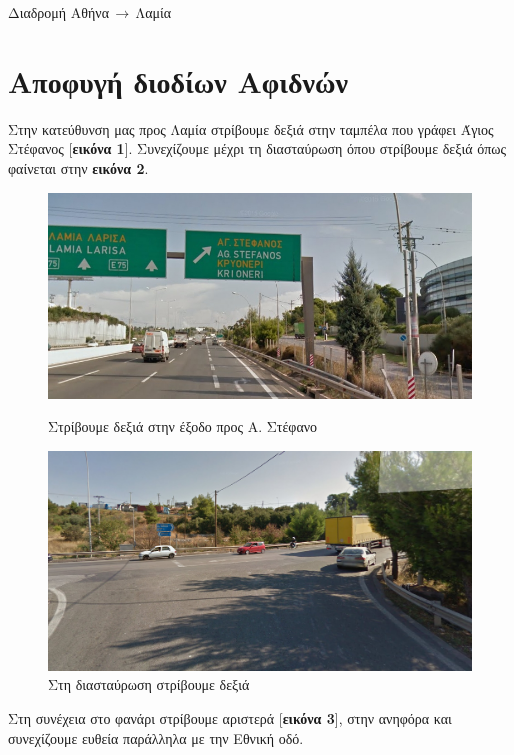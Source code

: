 \begin{center}
\begin{huge}
Διαδρομή Αθήνα$\,\to\,$Λαμία
\end{huge}
\section*{Αποφυγή διοδίων Αφιδνών}
\end{center}
Στην κατεύθυνση μας προς Λαμία στρίβουμε δεξιά στην ταμπέλα που γράφει Άγιος Στέφανος [\textbf{εικόνα 1}]. Συνεχίζουμε μέχρι τη διασταύρωση όπου στρίβουμε δεξιά όπως φαίνεται στην \textbf{εικόνα 2}.

\begin{figure}[hbp!]
	\centering
		\includegraphics[width=\textwidth]{images/athina-lamia/astefanos/astefanos0.png} 
			\caption{Στρίβουμε δεξιά στην έξοδο προς Α. Στέφανο}
		\includegraphics[width=\textwidth]{images/athina-lamia/astefanos/astefanos1.PNG}
			\caption{Στη διασταύρωση στρίβουμε δεξιά}
\end{figure}

Στη συνέχεια στο φανάρι στρίβουμε αριστερά [\textbf{εικόνα 3}], στην ανηφόρα και συνεχίζουμε ευθεία παράλληλα με την Εθνική οδό.


